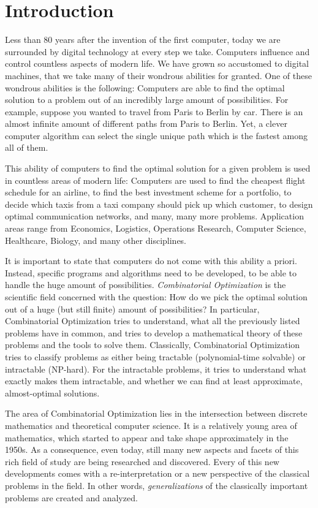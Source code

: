 \chapter{Introduction}
Less than 80 years after the invention of the first computer, today we are surrounded by digital technology at every step we take. 
Computers influence and control countless aspects of modern life. 
We have grown so accustomed to digital machines, that we take many of their wondrous abilities for granted. 
One of these wondrous abilities is the following: Computers are able to find the optimal solution to a problem out of an incredibly large amount of possibilities.
For example, suppose you wanted to travel from Paris to Berlin by car. There is an almost infinite amount of different paths from Paris to Berlin. Yet, a clever computer algorithm can select the single unique path which is the fastest among all of them.

This ability of computers to find the optimal solution for a given problem is used in countless areas of modern life: Computers are used to find the cheapest flight schedule for an airline, to find the best investment scheme for a portfolio, to decide which taxis from a taxi company should pick up which customer, to design optimal communication networks, and many, many more problems. Application areas range from Economics, Logistics, Operations Research, Computer Science, Healthcare, Biology, and many other disciplines.

It is important to state that computers do not come with this ability a priori. Instead, specific programs and algorithms need to be developed, to be able to handle the huge amount of possibilities. 
\emph{Combinatorial Optimization} is the scientific field concerned with the question: How do we pick the optimal solution out of a huge (but still finite) amount of possibilities? 
In particular, Combinatorial Optimization tries to understand, what all the previously listed problems have in common, and tries to develop a mathematical theory of these problems and the tools to solve them. Classically, Combinatorial Optimization tries to classify problems as either being tractable (polynomial-time solvable) or intractable (NP-hard). For the intractable problems, it tries to understand what exactly makes them intractable, and whether we can find at least approximate, almost-optimal solutions.

The area of Combinatorial Optimization lies in the intersection between discrete mathematics and theoretical computer science. 
It is a relatively young area of mathematics, which started to appear and take shape approximately in the 1950s. 
As a consequence, even today, still many new aspects and facets of this rich field of study are being researched and discovered. Every of this new developments comes with a re-interpretation or a new perspective of the classical problems in the field. In other words, \emph{generalizations} of the classically important problems are created and analyzed.

